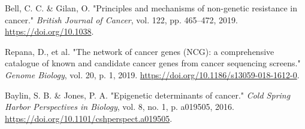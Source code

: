 \documentclass[conference]{IEEEtran}
\begin{document}
\begin{thebibliography}{99}
Bell, C. C. \& Gilan, O. "Principles and mechanisms of non-genetic resistance in cancer." \textit{British Journal of Cancer}, vol. 122, pp. 465–472, 2019. \url{https://doi.org/10.1038}.
	
Repana, D., et al. "The network of cancer genes (NCG): a comprehensive catalogue of known and candidate cancer genes from cancer sequencing screens." \textit{Genome Biology}, vol. 20, p. 1, 2019. \url{https://doi.org/10.1186/s13059-018-1612-0}.

Baylin, S. B. \& Jones, P. A. "Epigenetic determinants of cancer." \textit{Cold Spring Harbor Perspectives in Biology}, vol. 8, no. 1, p. a019505, 2016. \url{https://doi.org/10.1101/cshperspect.a019505}.



\end{thebibliography}

	
	
%	
	
\end{document}

